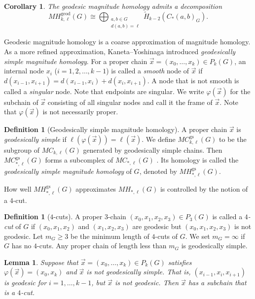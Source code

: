 \documentclass{amsart}
\numberwithin{equation}{section}
\newtheorem{cor}[thm]{Corollary}
\theoremstyle{plain}
\newtheorem{lem}[thm]{Lemma}
\theoremstyle{remark}
\theoremstyle{definition}
\newtheorem{defn}[thm]{Definition}
\numberwithin{equation}{section}
\newcommand{\geod}{\mathrm{geod}}
\newcommand{\gs}{\mathrm{gs}}
\begin{document}
\begin{cor}\label{geodMHdecomp}
    The geodesic magnitude homology admits a decomposition
    \[
    MH_{k,\ell}^{\geod}(G)\cong\bigoplus_{\substack{a,b\in G\\ d(a,b)=\ell}}\widetilde{H}_{k-2}(C_*(a,b)_G).
    \]
\end{cor}

Geodesic magnitude homology is a coarse approximation of magnitude homology. As a more refined approximation, Kaneta--Yoshinaga \cite{Kaneta2021} introduced \emph{geodesically simple magnitude homology}.
For a proper chain $\Vec{x}=(x_0,\ldots,x_k)\in P_k(G)$, an internal node $x_i$ ($i=1,2,\ldots,k-1$) is called a \emph{smooth} node of $\Vec{x}$ if $d(x_{i-1},x_{i+1})=d(x_{i-1},x_i)+d(x_i,x_{i+1})$. A node that is not smooth is called a \emph{singular} node. Note that endpoints are singular. We write $\varphi(\Vec{x})$ for the subchain of $\Vec{x}$ consisting of all singular nodes and call it the frame of $\Vec{x}$. Note that $\varphi(\Vec{x})$ is not necessarily proper.

\begin{defn}[Geodesically simple magnitude homology]
    A proper chain $\Vec{x}$ is \emph{geodesically simple} if $\ell(\varphi(\Vec{x}))=\ell(\Vec{x})$.
    We define $MC_{k,\ell}^{\gs}(G)$ to be the subgroup of $MC_{k,\ell}(G)$ generated by geodesically simple chains.
    Then $MC_{*,\ell}^{\gs}(G)$ forms a subcomplex of $MC_{*,\ell}(G)$ \cite[Propositions 3.6 and 3.7]{Kaneta2021}.
    Its homology is called the \emph{geodesically simple magnitude homology} of $G$, denoted by $MH_{*,\ell}^{\gs}(G)$.
\end{defn}

How well $MH_{*,\ell}^{\gs}(G)$ approximates $MH_{*,\ell}(G)$ is controlled by the notion of a $4$-cut.

\begin{defn}[$4$-cuts]
    A proper $3$-chain $(x_0,x_1,x_2,x_3)\in P_3(G)$ is called a \emph{$4$-cut} of $G$ if $(x_0,x_1,x_2)$ and $(x_1,x_2,x_3)$ are geodesic but $(x_0,x_1,x_2,x_3)$ is not geodesic. Let $m_G\geq 3$ be the minimum length of $4$-cuts of $G$. We set $m_G=\infty$ if $G$ has no $4$-cuts.
    Any proper chain of length less than $m_G$ is geodesically simple.
\end{defn}



\begin{lem}\label{exist4cut}
    Suppose that $\Vec{x}=(x_0,\ldots,x_k)\in P_k(G)$ satisfies $\varphi(\Vec{x})=(x_0,x_k)$ and $\Vec{x}$ is not geodesically simple.
    That is, $(x_{i-1},x_i,x_{i+1})$ is geodesic for $i=1,\ldots,k-1$, but $\Vec{x}$ is not geodesic.
    Then $\Vec{x}$ has a subchain that is a $4$-cut.
\end{lem}
\end{document}
